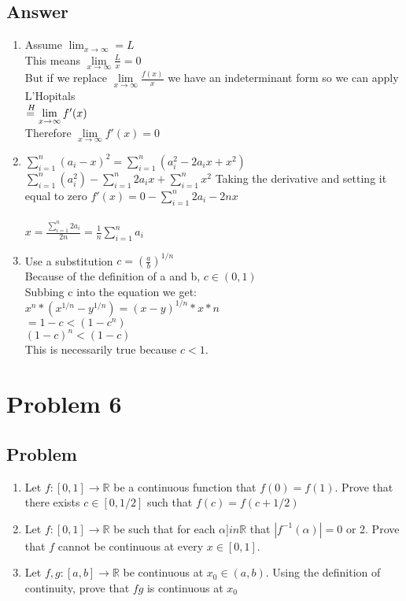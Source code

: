 \documentclass{article}
\newcommand\tab[1][1cm]{\hspace*{#1}}
\newcommand*\Heq{\ensuremath{\overset{\kern2pt H}{=}}}
\begin{document}
\subsection*{Answer}
\begin{enumerate}[label=(\alph*)]
	\item
		Assume \(\lim_{x\to\infty} = L\) \\
		This means \(\lim\limits_{x\to\infty}\frac{L}{x} = 0\) \\
		But if we replace \(\lim\limits_{x\to\infty}\frac{f(x)}{x} \) we have an indeterminant form so we can apply
		L'Hopitals \\
		\(\Heq \lim\limits_{x\to\infty}f'(x)\)\\
		Therefore \(\lim\limits_{x\to\infty}f'(x) = 0\)
	\item
		\(\sum\limits_{i=1}^{n}(a_{i} - x)^{2} = \sum\limits_{i=1}^{n}(a_{i}^{2}-2a_{i}x + x^{2})\) \\
		\(\sum\limits_{i=1}^{n}(a_{i}^{2}) - \sum\limits_{i=1}^{n}2a_{i}x + \sum\limits_{i=1}^{n}x^{2}\)
		Taking the derivative and setting it equal to zero
		\(f'(x) = 0 - \sum\limits_{i=1}^{n}2a_{i} - 2nx \) \\
		\\\(x = \frac{\sum\limits_{i=1}^{n}2a_{i}}{2n} = \frac{1}{n} \sum\limits_{i=1}^{n}a_{i}\)
	\item
		Use a substitution \(c = (\frac{a}{b})^{1/n}\) \\
		Because of the definition of a and b, \(c \in (0, 1)\)\\
		Subbing c into the equation we get: \\
\tab[2cm]	\(x^{n} * (x^{1/n} - y^{1/n}) = (x - y)^{1/n} * x*{n}\) \\
		\( = 1 - c < (1 - c^{n})\)\\
		\((1- c)^{n} < (1-c)\) \\
		This is necessarily true because \(c < 1\).
\end{enumerate}
\section*{Problem 6}
\subsection*{Problem}
\begin{enumerate}[label=(\alph*)]
	\item 	Let \(f: [0,1] \to \mathbb{R}\) be a continuous function that \(f(0) = f(1)\). Prove that there exists \(c \in [0, 1/2]\)
		such that \(f(c) = f(c + 1/2)\) 
	\item 	Let \(f: [0,1] \to \mathbb{R}\) be such that for each \(\alpha ]in \mathbb{R}\) that \(|f^{-1}(\alpha)| = 0\) or 2.
		 Prove that \(f\) cannot be continuous at every \(x\in [0,1]\).
	\item 	Let \(f,g: [a,b] \to \mathbb{R}\) be continuous at \(x_{0} \in (a,b)\). Using the definition of continuity, prove that 
		\(fg\) is continuous at \(x_{0}\) 	
	
\end{enumerate}
\end{document}
